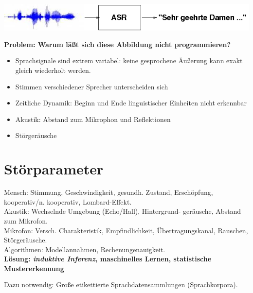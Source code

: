 \documentclass[11pt]{book}
\newcommand{\begi}{\begin{itemize} \setlength{\itemsep}{0.2cm}}
\newcommand{\ndit}{\end{itemize}}
\begin{document}
\includegraphics[width=\textwidth]{grafiken/automatische-spracherkennung/block.png}

{\bf Problem: Warum l\"a{\ss}t sich diese Abbildung nicht programmieren?}
\begi
\item Sprachsignale sind extrem variabel: keine gesprochene \"Au{\ss}erung kann
exakt gleich wiederholt werden.
\item Stimmen verschiedener Sprecher unterscheiden sich
\item Zeitliche Dynamik: Beginn und Ende linguistischer Einheiten nicht erkennbar
\item Akustik: Abstand zum Mikrophon und Reflektionen
\item St\"orger\"ausche
\ndit

\section{Störparameter} 

Mensch:  Stimmung, Geschwindigkeit, gesundh. Zustand,
                 Erschöpfung, kooperativ/n. kooperativ,
                 Lombard-Effekt.\\
Akustik: Wechselnde Umgebung (Echo/Hall), Hintergrund-
                 geräusche, Abstand zum Mikrofon.\\
Mikrofon: Versch. Charakteristik, Empfindlichkeit,
                  Übertragungskanal, Rauschen, Störgeräusche.\\
Algorithmen: Modellannahmen, Rechenungenauigkeit.\\

{\bf L\"osung: \textit{induktive Inferenz}, maschinelles Lernen, statistische Mustererkennung}

Dazu notwendig: Große etikettierte Sprachdatensammlungen (Sprachkorpora).
\end{document}
